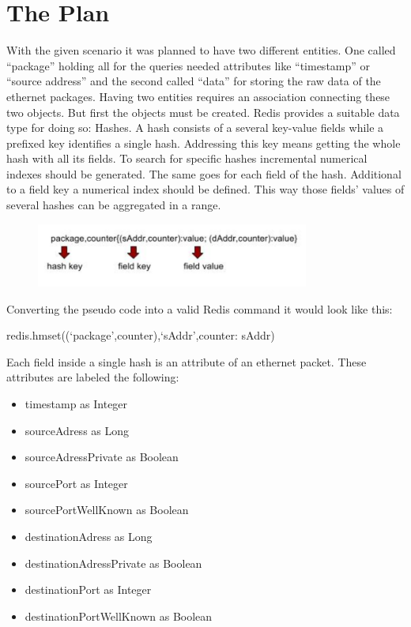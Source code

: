 \section{The Plan}

With the given scenario it was planned to have two different entities. One called “package” holding all for the queries needed attributes like “timestamp” or “source address” and the second called “data” for storing the raw data of the ethernet packages. Having two entities requires an association connecting these two objects. But first the objects must be created. Redis provides a suitable data type for doing so: Hashes. A hash consists of a several key-value fields while a prefixed key identifies a single hash. Addressing this key means getting the whole hash with all its fields. To search for specific hashes incremental numerical indexes should be generated. The same goes for each field of the hash. Additional to a field key a numerical index should be defined. This way those fields’ values of several hashes can be aggregated in a range. 

  \begin{figure}[htb!]
	\centerline{\includegraphics[width=0.8\textwidth]{resources/plan.png}}
\end{figure}

Converting the pseudo code into a valid Redis command it would look like this:

redis.hmset((‘package’,counter),{‘sAddr’,counter: sAddr})

Each field inside a single hash is an attribute of an ethernet packet. These attributes are labeled the following:
\begin{itemize}
	\item timestamp as Integer
	\item sourceAdress as Long
	\item sourceAdressPrivate as Boolean
	\item sourcePort as Integer
\item 	sourcePortWellKnown as Boolean
\item 	destinationAdress as Long
\item 	destinationAdressPrivate as Boolean
\item 	destinationPort as Integer
\item 	destinationPortWellKnown as Boolean
\end{itemize}

